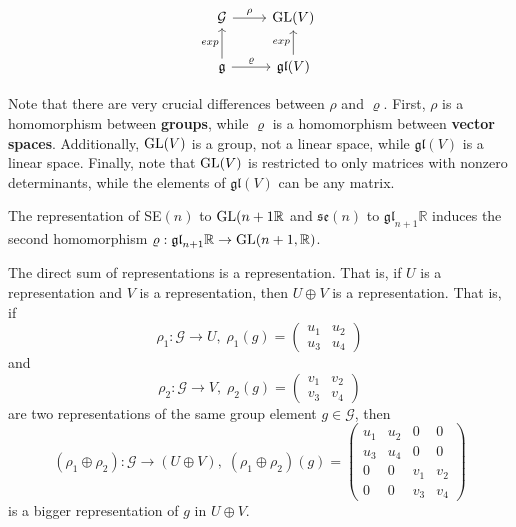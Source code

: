   \[\begin{tikzcd}
  \mathcal{G} \arrow{r}{\rho} & \GL(V)\\
  \mathfrak{g} \arrow{u}{exp} \arrow{r}{\varrho} & \mathfrak{gl}(V) \arrow{u}{exp}
  \end{tikzcd}\]

  Note that there are very crucial differences between $\rho$ and $\varrho$. First, $\rho$ is a homomorphism between \textbf{groups}, while $\varrho$ is a homomorphism between \textbf{vector spaces}. Additionally, $\operatorname{GL}(V)$ is a group, not a linear space, while $\mathfrak{gl}(V)$ is a linear space. Finally, note that $\operatorname{GL}(V)$ is restricted to only matrices with nonzero determinants, while the elements of $\mathfrak{gl}(V)$ can be any matrix. 

  \begin{example}
    The representation of SE$(n)$ to $\operatorname{GL}(n+1 \mathbb{R}$ and $\mathfrak{se}(n)$ to $\mathfrak{gl}_{n+1} \mathbb{R}$ induces the second homomorphism $\varrho: \mathfrak{gl}_{n+1} \mathbb{R} \rightarrow \operatorname{GL}(n+1, \mathbb{R})$. 
  \end{example}

  \begin{definition}
    The direct sum of representations is a representation. That is, if $U$ is a representation and $V$ is a representation, then $U \oplus V$ is a representation. That is, if 
    \begin{equation}
      \rho_1: \mathcal{G} \rightarrow U, \; \rho_1 (g) = \begin{pmatrix}
      u_1&u_2\\u_3&u_4
      \end{pmatrix}
    \end{equation}
    and
    \begin{equation}
      \rho_2: \mathcal{G} \rightarrow V, \; \rho_2 (g) = \begin{pmatrix}
      v_1 & v_2 \\ v_3 & v_4
      \end{pmatrix}
    \end{equation}
    are two representations of the same group element $g \in \mathcal{G}$, then 
    \begin{equation}
      (\rho_1 \oplus \rho_2): \mathcal{G} \rightarrow (U \oplus V), \;(\rho_1 \oplus \rho_2) (g) = \begin{pmatrix}
      u_1 & u_2 & 0 & 0 \\
      u_3 & u_4 & 0 & 0 \\
      0 & 0 & v_1 & v_2 \\
      0 & 0 & v_3 & v_4 
      \end{pmatrix}
    \end{equation}
    is a bigger representation of $g$ in $U \oplus V$. 
  \end{definition}

